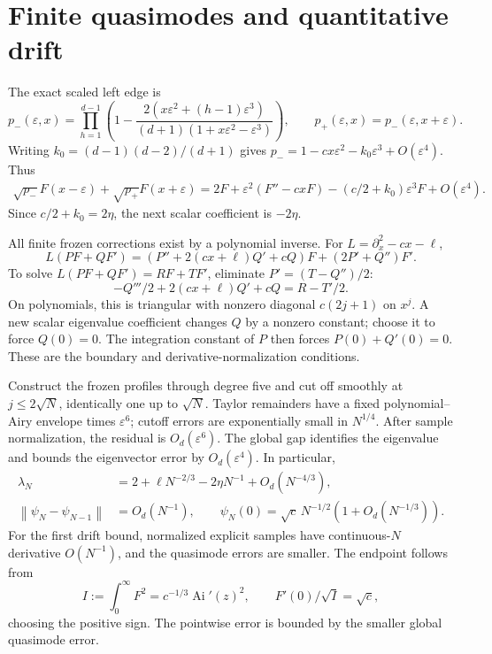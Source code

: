 \documentclass[11pt,letterpaper]{article}
\newcommand{\Ai}{\operatorname{Ai}}
\newcommand{\norm}[1]{\left\lVert#1\right\rVert}
\newcommand{\eps}{\varepsilon}
\theoremstyle{remark}
\begin{document}
\section{Finite quasimodes and quantitative drift}\label{tcn:d:sec:quasimodes}
The exact scaled left edge is
\begin{equation}\label{tcn:d:scaledp}
 p_-(\eps,x)=\prod_{h=1}^{d-1}
 \left(1-\frac{2(x\eps^2+(h-1)\eps^3)}{(d+1)(1+x\eps^2-\eps^3)}\right),
 \qquad p_+(\eps,x)=p_-(\eps,x+\eps).
\end{equation}
Writing $k_0=(d-1)(d-2)/(d+1)$ gives
$p_-=1-cx\eps^2-k_0\eps^3+O(\eps^4)$. Thus
\begin{align*}
 \sqrt{p_-}F(x-\eps)+\sqrt{p_+}F(x+\eps)
 =2F+\eps^2(F''-cxF)-(c/2+k_0)\eps^3F+O(\eps^4).
\end{align*}
Since $c/2+k_0=2\eta$, the next scalar coefficient is $-2\eta$.

All finite frozen corrections exist by a polynomial inverse. For $L=\partial_x^2-cx-\ell$,
\begin{equation}\label{tcn:d:airyalg}
 L(PF+QF')=(P''+2(cx+\ell)Q'+cQ)F+(2P'+Q'')F'.
\end{equation}
To solve $L(PF+QF')=RF+TF'$, eliminate $P'=(T-Q'')/2$:
\begin{equation}\label{tcn:d:triangular}
 -Q'''/2+2(cx+\ell)Q'+cQ=R-T'/2.
\end{equation}
On polynomials, this is triangular with nonzero diagonal $c(2j+1)$ on $x^j$. A new scalar eigenvalue coefficient changes $Q$ by a nonzero constant; choose it to force $Q(0)=0$. The integration constant of $P$ then forces $P(0)+Q'(0)=0$. These are the boundary and derivative-normalization conditions.

Construct the frozen profiles through degree five and cut off smoothly at $j\le2\sqrt N$, identically one up to $\sqrt N$. Taylor remainders have a fixed polynomial--Airy envelope times $\eps^6$; cutoff errors are exponentially small in $N^{1/4}$. After sample normalization, the residual is $O_d(\eps^6)$. The global gap identifies the eigenvalue and bounds the eigenvector error by $O_d(\eps^4)$. In particular,
\begin{align}
 \lambda_N&=2+\ell N^{-2/3}-2\eta N^{-1}+O_d(N^{-4/3}),\label{tcn:d:lambda}\\
 \norm{\psi_N-\psi_{N-1}}&=O_d(N^{-1}),\qquad
 \psi_N(0)=\sqrt c\,N^{-1/2}(1+O_d(N^{-1/3})).\label{tcn:d:drift}
\end{align}
For the first drift bound, normalized explicit samples have continuous-$N$ derivative $O(N^{-1})$, and the quasimode errors are smaller. The endpoint follows from
\begin{equation}\label{tcn:d:normF}
 I:=\int_0^\infty F^2=c^{-1/3}\Ai'(z)^2,
 \qquad F'(0)/\sqrt I=\sqrt c,
\end{equation}
choosing the positive sign. The pointwise error is bounded by the smaller global quasimode error.
\end{document}
